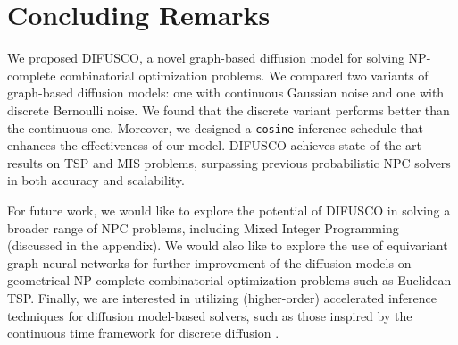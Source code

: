 \documentclass{article}
\theoremstyle{plain}
\theoremstyle{definition}
\theoremstyle{remark}
\newcommand{\method}{DIFUSCO}
\begin{document}
\section{Concluding Remarks}


We proposed \method{}, a novel graph-based diffusion model for solving NP-complete combinatorial optimization problems. We compared two variants of graph-based diffusion models: one with continuous Gaussian noise and one with discrete Bernoulli noise. We found that the discrete variant performs better than the continuous one. Moreover, we designed a \texttt{cosine} inference schedule that enhances the effectiveness of our model. \method{} achieves state-of-the-art results on TSP and MIS problems, surpassing previous probabilistic NPC solvers in both accuracy and scalability.

For future work, we would like to explore the potential of \method{} in solving a broader range of NPC problems, including Mixed Integer Programming (discussed in the appendix). We would also like to explore 
the use of equivariant graph neural networks \citep{xu2021geodiff,hoogeboom2022equivariant} 
for further improvement of
the diffusion models on geometrical NP-complete combinatorial optimization 
problems such as Euclidean TSP. Finally, we are interested in utilizing (higher-order) accelerated inference techniques for diffusion model-based solvers, such as those inspired by the continuous time framework for discrete diffusion \citep{campbell2022a,sun2022score}.






\newpage

\end{document}
